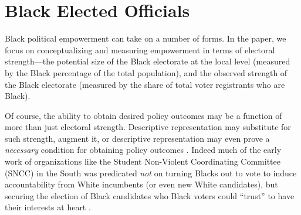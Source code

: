 \documentclass[12pt]{article}
\begin{document}



\section{Black Elected Officials}\label{appendix_beo}
\setcounter{table}{0}
\setcounter{figure}{0}
\renewcommand{\thetable}{H\arabic{table}}
\renewcommand{\thefigure}{H\arabic{figure}}
\normalsize


Black political empowerment can take on a number of forms.  In the paper, we focus on conceptualizing and measuring empowerment in terms of electoral strength---the potential size of the Black electorate at the local level (measured by the Black percentage of the total population), and the observed strength of the Black electorate (measured by the share of total voter registrants who are Black).

Of course, the ability to obtain desired policy outcomes may be a function of more than just electoral strength.  Descriptive representation may substitute for such strength, augment it, or descriptive representation may even prove a \emph{necessary} condition for obtaining policy outcomes .  Indeed much of the early work of organizations like the Student Non-Violent Coordinating Committee (SNCC) in the South was predicated \emph{not} on turning Blacks out to vote to induce accountability from White incumbents (or even new White candidates), but securing the election of Black candidates who Black voters could ``trust'' to have their interests at heart .
\end{document}
